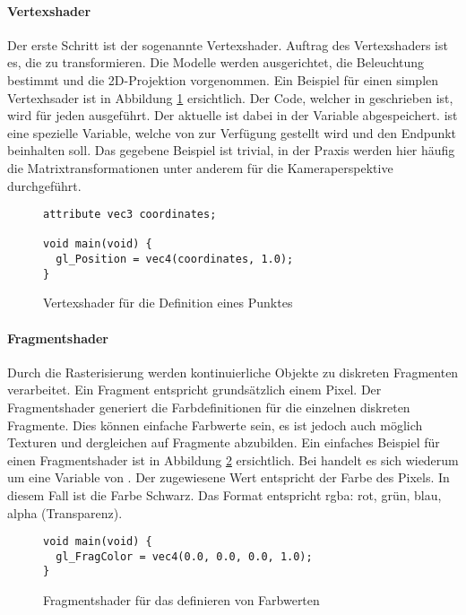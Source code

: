 \paragraph{Vertexshader}
Der erste Schritt ist der sogenannte Vertexshader. Auftrag des Vertexshaders ist es, die  zu transformieren. Die Modelle werden ausgerichtet, die Beleuchtung bestimmt und die 2D-Projektion vorgenommen. Ein Beispiel für einen simplen Vertexhsader ist in Abbildung \ref{fig:vertexShader} ersichtlich. Der Code, welcher in  geschrieben ist, wird für jeden  ausgeführt. Der aktuelle  ist dabei in der Variable  abgespeichert.  ist eine spezielle Variable, welche von  zur Verfügung gestellt wird und den Endpunkt beinhalten soll. Das gegebene Beispiel ist trivial, in der Praxis werden hier häufig die Matrixtransformationen unter anderem für die Kameraperspektive durchgeführt.

\begin{figure}[H]
\begin{lstlisting}[style=glsl]
attribute vec3 coordinates;

void main(void) {
  gl_Position = vec4(coordinates, 1.0);
}
\end{lstlisting}
\caption{Vertexshader für die Definition eines Punktes}
\label{fig:vertexShader}
\end{figure}

\paragraph{Fragmentshader}
Durch die Rasterisierung werden kontinuierliche Objekte zu diskreten Fragmenten verarbeitet. Ein Fragment entspricht grundsätzlich einem Pixel. Der Fragmentshader generiert die Farbdefinitionen für die einzelnen diskreten Fragmente. Dies können einfache Farbwerte sein, es ist jedoch auch möglich Texturen und dergleichen auf Fragmente abzubilden. Ein einfaches Beispiel für einen Fragmentshader ist in Abbildung \ref{fig:fragmentShader} ersichtlich. Bei  handelt es sich wiederum um eine Variable von . Der zugewiesene Wert entspricht der Farbe des Pixels. In diesem Fall ist die Farbe Schwarz. Das Format entspricht rgba: rot, grün, blau, alpha (Transparenz).

\begin{figure}[H]
\begin{lstlisting}[style=glsl]
void main(void) {
  gl_FragColor = vec4(0.0, 0.0, 0.0, 1.0);
}
\end{lstlisting}
\caption{Fragmentshader für das definieren von Farbwerten}
\label{fig:fragmentShader}
\end{figure}


